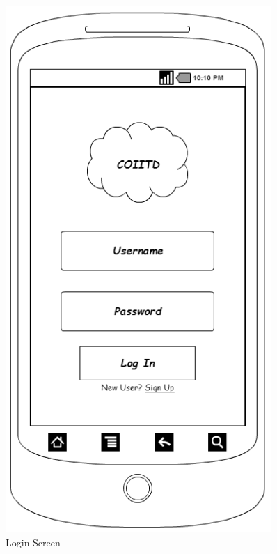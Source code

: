 \documentclass[12pt]{article}
\begin{document}
\begin{figure}[H]
\begin{minipage}{.5\textwidth}
      \includegraphics[width=0.9\textwidth]{./appMockUp/loginScreen}
      \caption{Login Screen}
      \label{fig:loginScreen}
    \end{minipage}

    \end{figure}



\end{document}
